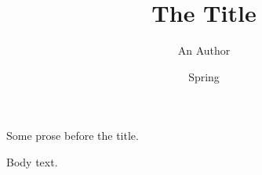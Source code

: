 \documentclass{article}
\title{The Title}\author{An Author}\date{Spring}
\begin{document}
Some prose before the title.
\maketitle
Body text.
\end{document}
